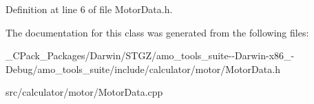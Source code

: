 Definition at line 6 of file Motor\+Data.\+h.



The documentation for this class was generated from the following files\+:\begin{DoxyCompactItemize}
\item 
\+\_\+\+C\+Pack\+\_\+\+Packages/\+Darwin/\+S\+T\+G\+Z/amo\+\_\+tools\+\_\+suite-\/-\/\+Darwin-\/x86\+\_-\/\+Debug/amo\+\_\+tools\+\_\+suite/include/calculator/motor/Motor\+Data.\+h\item 
src/calculator/motor/Motor\+Data.\+cpp\end{DoxyCompactItemize}
